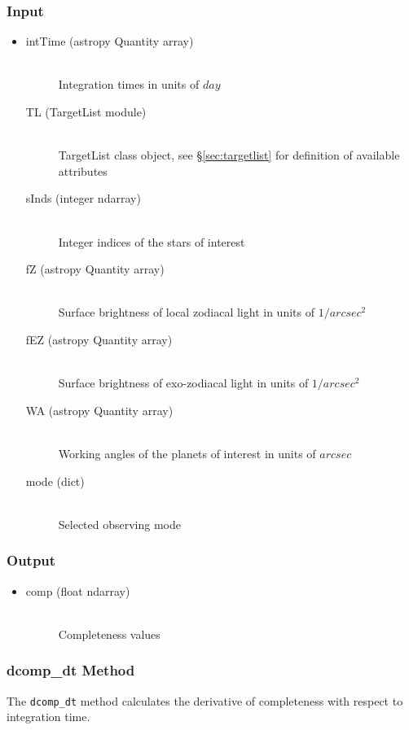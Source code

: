 \documentclass[cleanfoot]{asme2ej}
\begin{document}
\subsubsection*{Input}
\begin{itemize}
\item 
\begin{description}
    \item[intTime (astropy Quantity array)] \hfill \\ Integration times in units of $ day $
    \item[TL (TargetList module)] \hfill \\ TargetList class object, see \S\ref{sec:targetlist} for definition of available attributes
    \item[sInds (integer ndarray)] \hfill \\ Integer indices of the stars of interest
    \item[fZ (astropy Quantity array)] \hfill \\ Surface brightness of local zodiacal light in units of $ 1/arcsec^2 $
    \item[fEZ (astropy Quantity array)] \hfill \\ Surface brightness of exo-zodiacal light in units of $ 1/arcsec^2 $
    \item[WA (astropy Quantity array)] \hfill \\ Working angles of the planets of interest in units of $ arcsec $
    \item[mode (dict)] \hfill \\ Selected observing mode
\end{description}
\end{itemize}
\subsubsection*{Output}
\begin{itemize}
\item 
\begin{description}
    \item[comp (float ndarray)] \hfill \\
        Completeness values
\end{description}
\end{itemize}

\subsubsection{dcomp\_dt Method}
\label{sec:dcompdt}
The \verb+dcomp_dt+ method calculates the derivative of completeness with respect to integration time.
\end{document}
